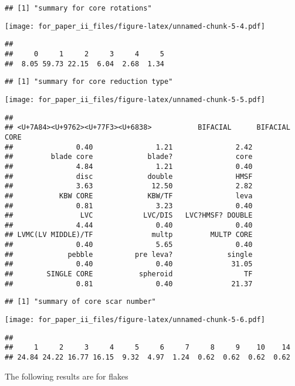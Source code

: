 \documentclass[]{article}
\begin{document}
\begin{verbatim}
## [1] "summary for core rotations"
\end{verbatim}

\texttt{[image: for\_paper\_ii\_files/figure-latex/unnamed-chunk-5-4.pdf]}

\begin{verbatim}
## 
##     0     1     2     3     4     5 
##  8.05 59.73 22.15  6.04  2.68  1.34
\end{verbatim}

\begin{verbatim}
## [1] "summary for core reduction type"
\end{verbatim}

\texttt{[image: for\_paper\_ii\_files/figure-latex/unnamed-chunk-5-5.pdf]}

\begin{verbatim}
## 
## <U+7A84><U+9762><U+77F3><U+6838>           BIFACIAL      BIFACIAL CORE 
##               0.40               1.21               2.42 
##         blade core             blade?               core 
##               4.84               1.21               0.40 
##               disc             double               HMSF 
##               3.63              12.50               2.82 
##           KBW CORE             KBW/TF               leva 
##               0.81               3.23               0.40 
##                LVC            LVC/DIS   LVC?HMSF? DOUBLE 
##               4.44               0.40               0.40 
## LVMC(LV MIDDLE)/TF              multp         MULTP CORE 
##               0.40               5.65               0.40 
##             pebble          pre leva?             single 
##               0.40               0.40              31.05 
##        SINGLE CORE           spheroid                 TF 
##               0.81               0.40              21.37
\end{verbatim}

\begin{verbatim}
## [1] "summary of core scar number"
\end{verbatim}

\texttt{[image: for\_paper\_ii\_files/figure-latex/unnamed-chunk-5-6.pdf]}

\begin{verbatim}
## 
##     1     2     3     4     5     6     7     8     9    10    14 
## 24.84 24.22 16.77 16.15  9.32  4.97  1.24  0.62  0.62  0.62  0.62
\end{verbatim}

The following results are for flakes
\end{document}
